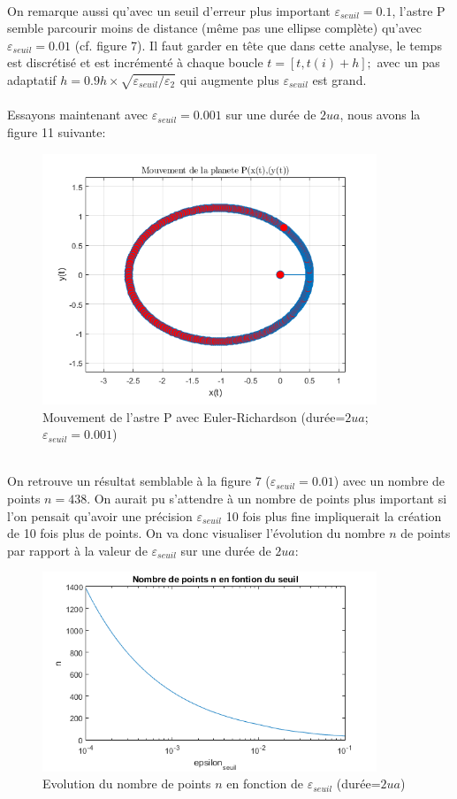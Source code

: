 \documentclass[11pt]{article} %
\begin{document}
\\ On remarque aussi qu'avec un seuil d'erreur plus important $\varepsilon_{seuil}=0.1$, l'astre P semble parcourir moins de distance (même pas une ellipse complète) qu'avec $\varepsilon_{seuil}=0.01$ (cf. figure 7). Il faut garder en tête que dans cette analyse, le temps est discrétisé et est incrémenté à chaque boucle $t = [t, t(i)+h];$ avec un pas adaptatif $h = 0.9h\times\sqrt{\varepsilon_{seuil}/\varepsilon_2}$ qui augmente plus $\varepsilon_{seuil}$ est grand.
\\\\ Essayons maintenant avec $\varepsilon_{seuil}=0.001$ sur une durée de $2 ua$, nous avons la figure 11 suivante:
\begin{figure}[h]
\includegraphics[width=10cm]{fig_euler_rich_5}
\centering
\caption{Mouvement de l'astre P avec Euler-Richardson (durée=$2ua$; $\varepsilon_{seuil}=0.001$)}
\end{figure}
\\On retrouve un résultat semblable à la figure 7 ($\varepsilon_{seuil}=0.01$) avec un nombre de points $n=438$. On aurait pu s'attendre à un nombre de points plus important si l'on pensait qu'avoir une précision $\varepsilon_{seuil}$ 10 fois plus fine impliquerait la création de 10 fois plus de points. On va donc visualiser l'évolution du nombre $n$ de points par rapport à la valeur de $\varepsilon_{seuil}$ sur une durée de $2ua$:
\begin{figure}[h]
\includegraphics[width=10cm]{fig_euler_rich_6}
\centering
\caption{Evolution du nombre de points $n$ en fonction de $\varepsilon_{seuil}$ (durée=$2ua$)}
\end{figure}
\end{document}
